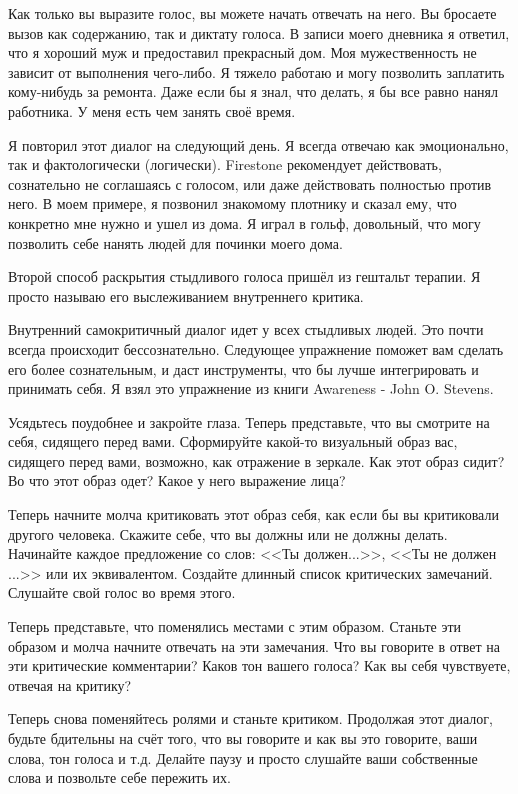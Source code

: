 \documentclass[10pt, fleqn]{article}
\begin{document}
Как только вы выразите голос, вы можете начать отвечать на него. Вы бросаете вызов как содержанию, так и диктату голоса. В записи моего дневника я ответил, что я хороший муж и предоставил прекрасный дом. Моя мужественность не зависит от выполнения чего-либо. Я тяжело работаю и могу позволить заплатить кому-нибудь за ремонта. Даже если бы я знал, что делать, я бы все равно нанял работника. У меня есть чем занять своё время.

Я повторил этот диалог на следующий день. Я всегда отвечаю как эмоционально, так и фактологически (логически). Firestone рекомендует действовать, сознательно не соглашаясь с голосом, или даже действовать полностью против него. В моем примере, я позвонил знакомому плотнику и сказал ему, что конкретно мне нужно и ушел из дома. Я играл в гольф, довольный, что могу позволить себе нанять людей для починки моего дома.


Второй способ раскрытия стыдливого голоса пришёл из гештальт терапии. Я просто называю его выслеживанием внутреннего критика.

Внутренний самокритичный диалог идет у всех стыдливых людей. Это почти всегда происходит бессознательно. Следующее упражнение поможет вам сделать его более сознательным, и даст инструменты, что бы лучше интегрировать и принимать себя. Я взял это упражнение из книги Awareness - John O. Stevens.

Усядьтесь поудобнее и закройте глаза. Теперь представьте, что вы смотрите на себя, сидящего перед вами. Сформируйте какой-то визуальный образ вас, сидящего перед вами, возможно, как отражение в зеркале. Как этот образ сидит? Во что этот образ одет? Какое у него выражение лица?

Теперь начните молча критиковать этот образ себя, как если бы вы критиковали другого человека. Скажите себе, что вы должны или не должны делать. Начинайте каждое предложение со слов: <<Ты должен...>>, <<Ты не должен ...>> или их эквивалентом.
Создайте длинный список критических замечаний. Слушайте свой голос во время этого.

Теперь представьте, что поменялись местами с этим образом. Станьте эти образом и молча начните отвечать на эти замечания. Что вы говорите в ответ на эти критические комментарии? Каков тон вашего голоса? Как вы себя чувствуете, отвечая на критику?

Теперь снова поменяйтесь ролями и станьте критиком. Продолжая этот диалог, будьте бдительны на счёт того, что вы говорите и как вы это говорите, ваши слова, тон голоса и т.д. Делайте паузу и просто слушайте ваши собственные слова и позвольте себе пережить их.
\end{document}
